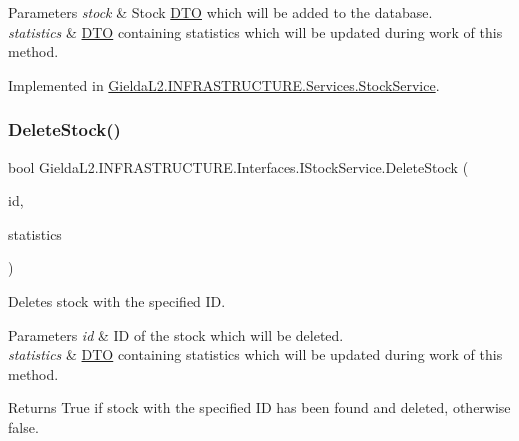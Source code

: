 \begin{DoxyParams}{Parameters}
{\em stock} & Stock \mbox{\hyperlink{namespace_gielda_l2_1_1_i_n_f_r_a_s_t_r_u_c_t_u_r_e_1_1_d_t_o}{D\+TO}} which will be added to the database.\\
\hline
{\em statistics} & \mbox{\hyperlink{namespace_gielda_l2_1_1_i_n_f_r_a_s_t_r_u_c_t_u_r_e_1_1_d_t_o}{D\+TO}} containing statistics which will be updated during work of this method.\\
\hline
\end{DoxyParams}


Implemented in \mbox{\hyperlink{class_gielda_l2_1_1_i_n_f_r_a_s_t_r_u_c_t_u_r_e_1_1_services_1_1_stock_service_a6d019e5819834d6f1636180026d11dab}{Gielda\+L2.\+I\+N\+F\+R\+A\+S\+T\+R\+U\+C\+T\+U\+R\+E.\+Services.\+Stock\+Service}}.

\mbox{\label{interface_gielda_l2_1_1_i_n_f_r_a_s_t_r_u_c_t_u_r_e_1_1_interfaces_1_1_i_stock_service_aaee8771ad67aa0e4ecd5a53a1defa1aa}} 
\subsubsection{\texorpdfstring{DeleteStock()}{DeleteStock()}}
{\footnotesize\ttfamily bool Gielda\+L2.\+I\+N\+F\+R\+A\+S\+T\+R\+U\+C\+T\+U\+R\+E.\+Interfaces.\+I\+Stock\+Service.\+Delete\+Stock (\begin{DoxyParamCaption}\item[{int}]{id,  }\item[{\mbox{\hyperlink{class_gielda_l2_1_1_i_n_f_r_a_s_t_r_u_c_t_u_r_e_1_1_d_t_o_1_1_statistics_d_t_o}{Statistics\+D\+TO}}}]{statistics }\end{DoxyParamCaption})}



Deletes stock with the specified ID. 


\begin{DoxyParams}{Parameters}
{\em id} & ID of the stock which will be deleted.\\
\hline
{\em statistics} & \mbox{\hyperlink{namespace_gielda_l2_1_1_i_n_f_r_a_s_t_r_u_c_t_u_r_e_1_1_d_t_o}{D\+TO}} containing statistics which will be updated during work of this method.\\
\hline
\end{DoxyParams}
\begin{DoxyReturn}{Returns}
True if stock with the specified ID has been found and deleted, otherwise false.
\end{DoxyReturn}


